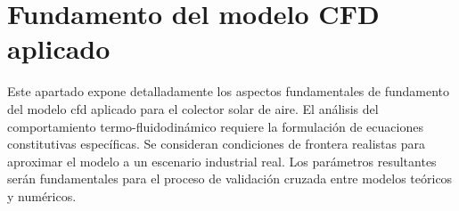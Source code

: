 \section{Fundamento del modelo CFD aplicado}
\label{sec:cap07_fundamento}

Este apartado expone detalladamente los aspectos fundamentales de fundamento del modelo cfd aplicado para el colector solar de aire.
El análisis del comportamiento termo-fluidodinámico requiere la formulación de ecuaciones constitutivas específicas.
Se consideran condiciones de frontera realistas para aproximar el modelo a un escenario industrial real.
Los parámetros resultantes serán fundamentales para el proceso de validación cruzada entre modelos teóricos y numéricos.
